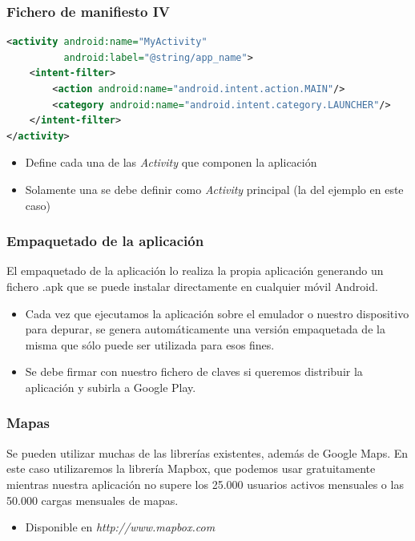 \documentclass[xcolor={dvipsnames}]{beamer}
\begin{document}
\begin{frame}[fragile]\frametitle{Fichero de manifiesto IV}
    \begin{block}{}
    \begin{lstlisting}[language=XML]
<activity android:name="MyActivity"
          android:label="@string/app_name">
    <intent-filter>
        <action android:name="android.intent.action.MAIN"/>
        <category android:name="android.intent.category.LAUNCHER"/>
    </intent-filter>
</activity>
    \end{lstlisting}
    \end{block}
    \begin{block}{}
    \begin{itemize}
        \item Define cada una de las \emph{Activity} que componen la aplicación
        \item Solamente una se debe definir como \emph{Activity} principal (la del ejemplo en este caso)
    \end{itemize}
    \end{block}
\end{frame}

\begin{frame}\frametitle{Empaquetado de la aplicación}
    \begin{block}{}
    El empaquetado de la aplicación lo realiza la propia aplicación generando un fichero .apk que se puede instalar directamente en
    cualquier móvil Android.
    \end{block}
    \begin{itemize}
        \item Cada vez que ejecutamos la aplicación sobre el emulador o nuestro dispositivo para depurar, se genera automáticamente una
        versión empaquetada de la misma que sólo puede ser utilizada para esos fines.
        \item Se debe firmar con nuestro fichero de claves si queremos distribuir la aplicación y subirla a Google Play.
    \end{itemize}

\end{frame}

\begin{frame}\frametitle{Mapas}
    \begin{block}{}
    Se pueden utilizar muchas de las librerías existentes, además de Google Maps. En este caso utilizaremos la librería Mapbox, que podemos
    usar gratuitamente mientras nuestra aplicación no supere los 25.000 usuarios activos mensuales o las 50.000 cargas mensuales de mapas.
    \end{block}
    \begin{itemize}
        \item Disponible en \emph{http://www.mapbox.com} 
    \end{itemize}

\end{frame}
\end{document}
